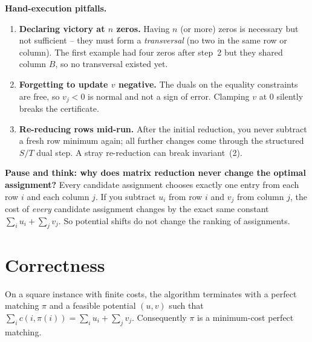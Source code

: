 \begin{trapbox}
\textbf{Hand-execution pitfalls.}
\begin{enumerate}
  \item \textbf{Declaring victory at $n$ zeros.} Having $n$ (or more) zeros is necessary but not sufficient -- they must form a \emph{transversal} (no two in the same row or column). The first example had four zeros after step~2 but they shared column $B$, so no transversal existed yet.
  \item \textbf{Forgetting to update $v$ negative.} The duals on the equality constraints are free, so $v_j<0$ is normal and not a sign of error. Clamping $v$ at $0$ silently breaks the certificate.
  \item \textbf{Re-reducing rows mid-run.} After the initial reduction, you never subtract a fresh row minimum again; all further changes come through the structured $S/T$ dual step. A stray re-reduction can break invariant~(2).
\end{enumerate}
\end{trapbox}

\begin{recoverybox}
\textbf{Pause and think: why does matrix reduction never change the optimal assignment?}
Every candidate assignment chooses exactly one entry from each row $i$ and each column $j$. If you subtract $u_i$ from row $i$ and $v_j$ from column $j$, the cost of \emph{every} candidate assignment changes by the exact same constant $\sum_i u_i + \sum_j v_j$. So potential shifts do not change the ranking of assignments.
\end{recoverybox}

\section{Correctness}
\label{ch16:correctness}

\begin{theorem}
\label{ch16:thm-correct}
On a square instance with finite costs, the algorithm terminates with a perfect matching $\pi$ and a feasible potential $(u,v)$ such that $\sum_i c(i,\pi(i)) = \sum_i u_i + \sum_j v_j$. Consequently $\pi$ is a minimum-cost perfect matching.
\end{theorem}

